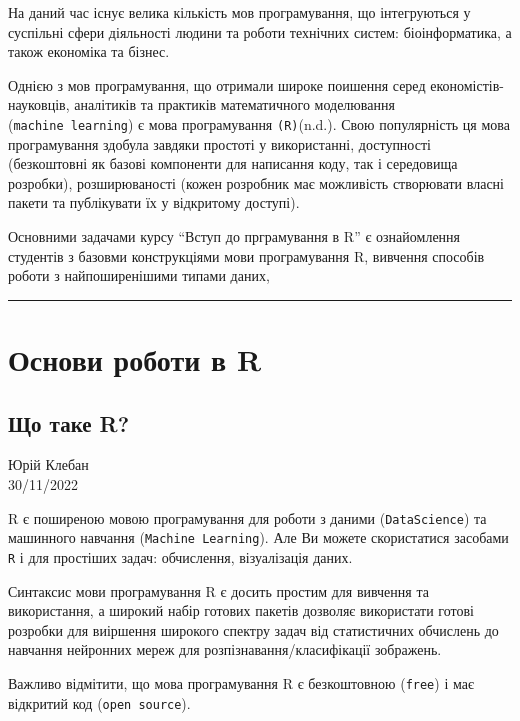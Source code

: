 \documentclass[
  letterpaper,
  DIV=11,
  numbers=noendperiod]{scrreprt}
\begin{document}
На даний час існує велика кількість мов програмування, що інтегруються у
суспільні сфери діяльності людини та роботи технічних систем:
біоінформатика, а також економіка та бізнес.

Однією з мов програмування, що отримали широке поишення серед
економістів-науковців, аналітиків та практиків математичного моделювання
(\texttt{machine\ learning}) є мова програмування \texttt{(R)}(n.d.).
Свою популярність ця мова програмування здобула завдяки простоті у
використанні, доступності (безкоштовні як базові компоненти для
написання коду, так і середовища розробки), розширюваності (кожен
розробник має можливість створювати власні пакети та публікувати їх у
відкритому доступі).

Основними задачами курсу ``Вступ до прграмування в R'' є ознайомлення
студентів з базовми конструкціями мови програмування R, вивчення
способів роботи з найпоширенішими типами даних,

\begin{center}\rule{0.5\linewidth}{0.5pt}\end{center}

\part{Основи роботи в R}

\hypertarget{ux449ux43e-ux442ux430ux43aux435-r}{%
\chapter{Що таке R?}\label{ux449ux43e-ux442ux430ux43aux435-r}}

Юрій Клебан\\
30/11/2022

\hfill\break

R є поширеною мовою програмування для роботи з даними
(\texttt{DataScience}) та машинного навчання
(\texttt{Machine\ Learning}). Але Ви можете скористатися засобами
\texttt{R} і для простіших задач: обчислення, візуалізація даних.

Синтаксис мови програмування R є досить простим для вивчення та
використання, а широкий набір готових пакетів дозволяє використати
готові розробки для виіршення широкого спектру задач від статистичних
обчислень до навчання нейронних мереж для розпізнавання/класифікації
зображень.

Важливо відмітити, що мова програмування R є безкоштовною
(\texttt{free}) і має відкритий код (\texttt{open\ source}).
\end{document}

